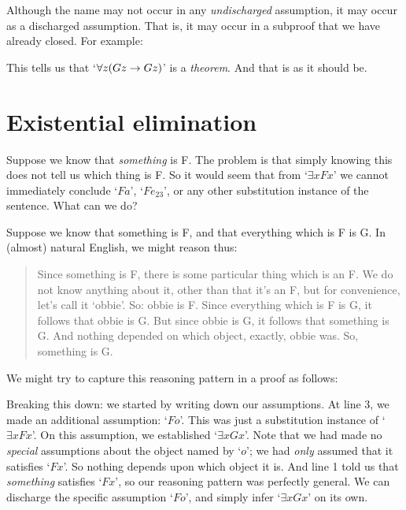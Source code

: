 Although the name may not occur in any \emph{undischarged} assumption, it may occur as a discharged assumption. That is, it may occur in a subproof that we have already closed. For example:
\begin{pf}
	\open
	\close
\end{pf}
This tells us that `$\forall z (Gz \rightarrow Gz)$' is a \emph{theorem}. And that is as it should be.

\section{Existential elimination}
Suppose we know that \emph{something} is F. The problem is that simply knowing this does not tell us which thing is F. So it would seem that from `$\exists x Fx$' we cannot immediately conclude `$Fa$', `$Fe_{23}$', or any other substitution instance of the sentence. What can we do?

Suppose we know that something is F, and that everything which is F is G. In (almost) natural English, we might reason thus:
	\begin{quote}
		Since something is F, there is some particular thing which is an F. We do not know anything about it, other than that it's an F, but for convenience, let's call it `obbie'. So: obbie is F. Since everything which is F is G, it follows that obbie is G. But since obbie is G, it follows that something is G. And nothing depended on which object, exactly, obbie was. So, something is G.
	\end{quote}
We might try to capture this reasoning pattern in a proof as follows:
\begin{pf}
	\open
		 
	\close
\end{pf}\noindent
Breaking this down: we started by writing down our assumptions. At line 3, we made an additional assumption: `$Fo$'. This was just a substitution instance of `$\exists x Fx$'. On this assumption, we established `$\exists x Gx$'. Note that we had made no \emph{special} assumptions about the object named by `$o$'; we had \emph{only} assumed that it satisfies `$Fx$'. So nothing depends upon which object it is. And line 1 told us that \emph{something} satisfies `$Fx$', so our reasoning pattern was perfectly general. We can discharge the specific assumption `$Fo$', and simply infer `$\exists x Gx$' on its own.

